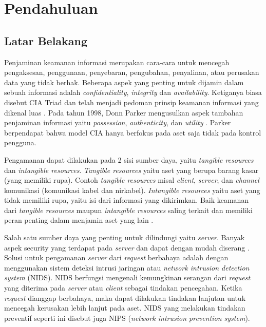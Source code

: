 
\chapter{Pendahuluan}


\section{Latar Belakang}

  Penjaminan keamanan informasi merupakan cara-cara untuk mencegah pengaksesan, penggunaan, penyebaran, pengubahan, penyalinan, atau perusakan data yang tidak berhak. Beberapa aspek yang penting untuk dijamin dalam sebuah informasi adalah \emph{confidentiality}, \emph{integrity} dan \emph{availability}. Ketiganya biasa disebut CIA Triad dan telah menjadi pedoman prinsip keamanan informasi yang dikenal luas \citep{nist2003}. Pada tahun 1998, Donn Parker mengusulkan aspek tambahan penjaminan informasi yaitu \emph{possession}, \emph{authenticity}, dan \emph{utility} \citep{parker1998}. Parker berpendapat bahwa model CIA hanya berfokus pada aset saja tidak pada kontrol pengguna.

  Pengamanan dapat dilakukan pada 2 sisi sumber daya, yaitu \emph{tangible resources} dan \emph{intangible resources}. \emph{Tangible resources} yaitu aset yang berupa barang kasar (yang memiliki rupa). Contoh \emph{tangible resources} misal \emph{client}, \emph{server}, dan \emph{channel} komunikasi (komunikasi kabel dan nirkabel). \emph{Intangible resources} yaitu aset yang tidak memiliki rupa, yaitu isi dari informasi yang dikirimkan. Baik keamanan dari \emph{tangible resources} maupun \emph{intangible resources} saling terkait dan memiliki peran penting dalam menjamin aset yang lain \citep{kizza2015}.

  Salah satu sumber daya yang penting untuk dilindungi yaitu \emph{server}. Banyak aspek security yang terdapat pada \emph{server} dan dapat dengan mudah diserang \citep{owasp}. Solusi untuk pengamanan \emph{server} dari \emph{request} berbahaya adalah dengan menggunakan sistem deteksi intrusi jaringan atau \emph{network intrusion detection system} (NIDS). NIDS berfungsi mengenali kemungkinan serangan dari \emph{request} yang diterima pada \emph{server} atau \emph{client} sebagai tindakan pencegahan. Ketika \emph{request} dianggap berbahaya, maka dapat dilakukan tindakan lanjutan untuk mencegah kerusakan lebih lanjut pada aset. NIDS yang melakukan tindakan preventif seperti ini disebut juga NIPS (\emph{network intrusion prevention system}).

